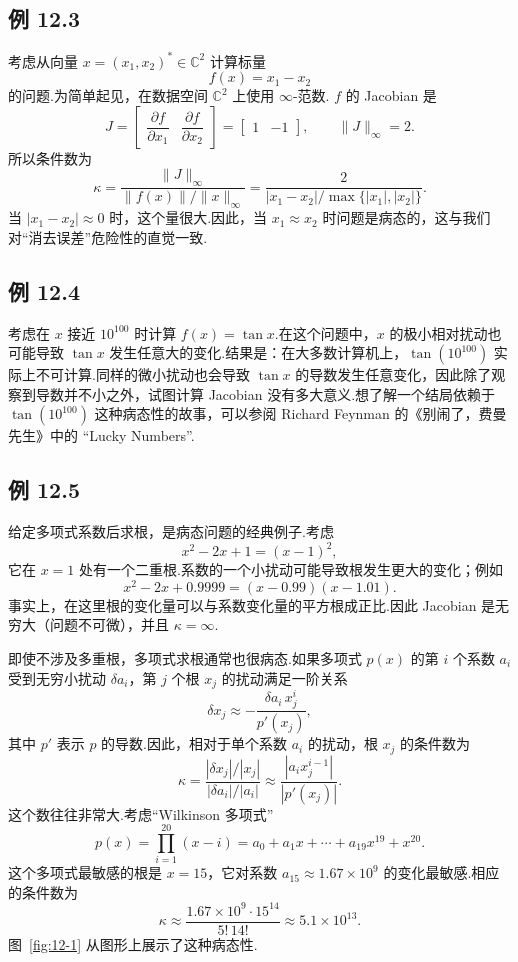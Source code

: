 \documentclass[UTF8,fontset=none,12pt]{ctexart}
\newcommand{\C}{\mathbb{C}}
\theoremstyle{definition}
\begin{document}
\subsection*{例 12.3}

考虑从向量 $x=(x_1,x_2)^*\in\C^2$ 计算标量
\[
    f(x)=x_1-x_2
\]
的问题.为简单起见，在数据空间 $\C^2$ 上使用 $\infty$-范数. $f$ 的 Jacobian 是
\[
    J=
    \begin{bmatrix}
        \dfrac{\partial f}{\partial x_1}&
        \dfrac{\partial f}{\partial x_2}
    \end{bmatrix}
    =
    \begin{bmatrix}1&-1\end{bmatrix},
    \qquad \|J\|_\infty=2.
\]
所以条件数为
\[
    \kappa
    =\frac{\|J\|_\infty}{\|f(x)\|/\|x\|_\infty}
    =
    \frac{2}{|x_1-x_2|/\max\{|x_1|,|x_2|\}}.
\]
当 $|x_1-x_2|\approx0$ 时，这个量很大.因此，当 $x_1\approx x_2$ 时问题是病态的，这与我们对“消去误差”危险性的直觉一致.

\subsection*{例 12.4}

考虑在 $x$ 接近 $10^{100}$ 时计算 $f(x)=\tan x$.在这个问题中，$x$ 的极小相对扰动也可能导致 $\tan x$ 发生任意大的变化.结果是：在大多数计算机上，$\tan(10^{100})$ 实际上不可计算.同样的微小扰动也会导致 $\tan x$ 的导数发生任意变化，因此除了观察到导数并不小之外，试图计算 Jacobian 没有多大意义.想了解一个结局依赖于 $\tan(10^{100})$ 这种病态性的故事，可以参阅 Richard Feynman 的《别闹了，费曼先生》中的 “Lucky Numbers”.

\subsection*{例 12.5}

给定多项式系数后求根，是病态问题的经典例子.考虑
\[
    x^2-2x+1=(x-1)^2,
\]
它在 $x=1$ 处有一个二重根.系数的一个小扰动可能导致根发生更大的变化；例如
\[
    x^2-2x+0.9999=(x-0.99)(x-1.01).
\]
事实上，在这里根的变化量可以与系数变化量的平方根成正比.因此 Jacobian 是无穷大（问题不可微），并且 $\kappa=\infty$.

即使不涉及多重根，多项式求根通常也很病态.如果多项式 $p(x)$ 的第 $i$ 个系数 $a_i$ 受到无穷小扰动 $\delta a_i$，第 $j$ 个根 $x_j$ 的扰动满足一阶关系
\[
    \delta x_j\approx-\frac{\delta a_i\,x_j^i}{p'(x_j)},
\]
其中 $p'$ 表示 $p$ 的导数.因此，相对于单个系数 $a_i$ 的扰动，根 $x_j$ 的条件数为
\begin{equation}
    \kappa
    =
    \frac{|\delta x_j|/|x_j|}{|\delta a_i|/|a_i|}
    \approx
    \frac{|a_i x_j^{i-1}|}{|p'(x_j)|}.
    \tag{12.7}
\end{equation}
这个数往往非常大.考虑“Wilkinson 多项式”
\begin{equation}
    p(x)=\prod_{i=1}^{20}(x-i)
    =a_0+a_1x+\cdots+a_{19}x^{19}+x^{20}.
    \tag{12.8}
\end{equation}
这个多项式最敏感的根是 $x=15$，它对系数 $a_{15}\approx1.67\times10^9$ 的变化最敏感.相应的条件数为
\[
    \kappa
    \approx
    \frac{1.67\times10^9\cdot15^{14}}{5!\,14!}
    \approx5.1\times10^{13}.
\]
图~\ref{fig:12-1} 从图形上展示了这种病态性.
\end{document}
